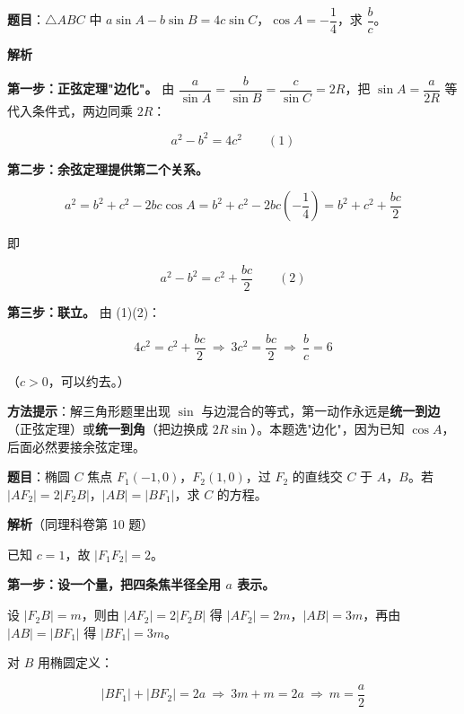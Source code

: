 \par\medskip


\textbf{题目}：$\triangle ABC$ 中 $a\sin A-b\sin B=4c\sin C$，$\cos A=-\dfrac14$，求 $\dfrac bc$。

\textbf{解析}

\textbf{第一步：正弦定理"边化"。} 由 $\dfrac a{\sin A}=\dfrac b{\sin B}=\dfrac c{\sin C}=2R$，把 $\sin A=\dfrac a{2R}$ 等代入条件式，两边同乘 $2R$：

\[a^{2}-b^{2}=4c^{2}\qquad(1)\]

\textbf{第二步：余弦定理提供第二个关系。}

\[a^{2}=b^{2}+c^{2}-2bc\cos A=b^{2}+c^{2}-2bc\left(-\frac14\right)=b^{2}+c^{2}+\frac{bc}2\]

即

\[a^{2}-b^{2}=c^{2}+\frac{bc}2\qquad(2)\]

\textbf{第三步：联立。} 由 (1)(2)：

\[4c^{2}=c^{2}+\frac{bc}2\ \Longrightarrow\ 3c^{2}=\frac{bc}2\ \Longrightarrow\ \frac bc=6\]

（$c>0$，可以约去。）


\begin{gktip}
\textbf{方法提示}：解三角形题里出现 $\sin$ 与边混合的等式，第一动作永远是\textbf{统一到边}（正弦定理）或\textbf{统一到角}（把边换成 $2R\sin$）。本题选"边化"，因为已知 $\cos A$，后面必然要接余弦定理。
\end{gktip}

\par\medskip


\textbf{题目}：椭圆 $C$ 焦点 $F_1(-1,0)$，$F_2(1,0)$，过 $F_2$ 的直线交 $C$ 于 $A$，$B$。若 $\left|AF_2\right|=2\left|F_2B\right|$，$|AB|=\left|BF_1\right|$，求 $C$ 的方程。

\textbf{解析}（同理科卷第 10 题）

已知 $c=1$，故 $\left|F_1F_2\right|=2$。

\textbf{第一步：设一个量，把四条焦半径全用 $a$ 表示。}

设 $\left|F_2B\right|=m$，则由 $\left|AF_2\right|=2\left|F_2B\right|$ 得 $\left|AF_2\right|=2m$，$|AB|=3m$，再由 $|AB|=\left|BF_1\right|$ 得 $\left|BF_1\right|=3m$。

对 $B$ 用椭圆定义：

\[\left|BF_1\right|+\left|BF_2\right|=2a\ \Longrightarrow\ 3m+m=2a\ \Longrightarrow\ m=\frac a2\]

